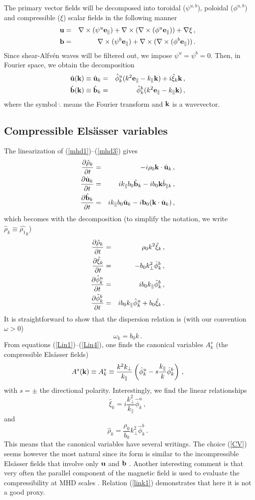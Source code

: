 \documentclass{jpp}
\def\be{\begin{equation}}
\def\ee{\end{equation}}
\def\ba{\begin{eqnarray}}
\def\ea{\end{eqnarray}}
\def\uu{{\bf u}}
\def\bbs{{\bf b}}
\def\kk{{\bf k}}
\def\kpa{k_{\parallel}}
\def\kpe{k_{\perp}}
\begin{document}
The primary vector fields will be decomposed into toroidal ($\psi^{u,b}$), poloidal ($\phi^{u,b}$) and compressible ($\xi$) scalar fields in the following manner
\ba
\uu &=& \nabla \times (\psi^u {\bf e_\parallel}) + \nabla \times (\nabla \times (\phi^u {\bf e_\parallel}) ) + \nabla \xi \, , \\
\bbs &=& \nabla \times (\psi^b {\bf e_\parallel}) + \nabla \times (\nabla \times (\phi^b {\bf e_\parallel}) ) \, .
\ea
Since shear-Alfv\'en waves will be filtered out, we impose $\psi^u = \psi^b = 0$. Then, in Fourier space, we obtain the decomposition
\ba
\hat \uu(\kk) \equiv \hat \uu_k &=& \hat \phi^u_k (k^2 {\bf e_\parallel} - \kpa \kk) + i \hat \xi_k \kk \, , \\
\hat \bbs(\kk) \equiv \hat \bbs_k &=& \hat \phi^b_k (k^2 {\bf e_\parallel} - \kpa \kk) \, ,
\ea
where the symbol $\hat .$ means the Fourier transform and $\kk$ is a wavevector. 


\subsection{Compressible Els\"asser variables}
The linearization of (\ref{mhd1})--(\ref{mhd3}) gives 
\ba
{\partial \hat \rho_k \over \partial t} &=& - i \rho_0 \kk \cdot \hat \uu_k \, ,\\
{\partial \hat \uu_k \over \partial t} &=& i \kpa b_0 {\hat \bbs}_k - i b_0 \kk {\hat b}_{\parallel k} \, , \\
{\partial \hat \bbs_k \over \partial t} &=& i \kpa b_0 \hat \uu_k - i \bbs_0 (\kk \cdot \hat \uu_k) \, ,
\ea
which becomes with the decomposition (to simplify the notation, we write $\hat \rho_k \equiv \hat {\rho_1}_k$)
\ba
{\partial \hat \rho_k \over \partial t} &=& \rho_0 k^2 \hat \xi_k \, , \label{Lin1} \\
{\partial \hat \xi_k \over \partial t} &=& - b_0 \kpe^2 \hat \phi^b_k \, , \label{Lin2} \\  
{\partial \hat \phi^u_k \over \partial t} &=& i b_0 \kpa \hat \phi^b_k \, , \label{Lin3} \\
{\partial \hat \phi^b_k \over \partial t} &=& i b_0 \kpa \hat \phi^u_k + b_0 \hat \xi_k \, . \label{Lin4} 
\ea
It is straightforward to show that the dispersion relation is (with our convention $\omega > 0$) 
\be
\omega_k = b_0 k \, .
\ee
From equations (\ref{Lin1})--(\ref{Lin4}), one finds the canonical variables $A_k^s$ (the compressible Els\"asser fields)
\be
A^s (\kk) \equiv A_k^s \equiv \frac{k^2 \kpe}{\kpa} \left( \hat \phi^u_k - s \frac{\kpa}{k} \hat \phi^b_k \right) \, , \label{CV}
\ee
with $s=\pm$ the directional polarity. Interestingly, we find the linear relationships
\be
\hat \xi_k = i \frac{\kpe^2}{\kpa} \hat \phi^u_k \, ,  \label{link1}
\ee
and 
\be 
\hat \rho_k = \frac{\rho_0}{b_0} \kpe^2 \hat \phi^b_k \, . \label{link2}
\ee
This means that the canonical variables have several writings. The choice (\ref{CV}) seems however the most natural since its form is similar to the incompressible Els\"asser fields that involve only $\uu$ and $\bbs$ \citep{GaltierCUP2016}. Another interesting comment is that very often the parallel component of the magnetic field is used to evaluate the compressibility at MHD scales \citep{Zank2022}. Relation (\ref{link1}) demonstrates that here it is not a good proxy.
\end{document}
